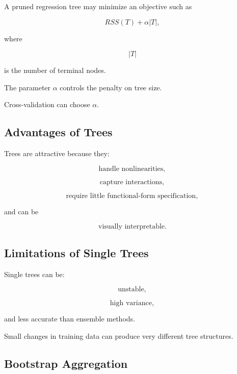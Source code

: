 A pruned regression tree may minimize an objective such as

\[
\boxed{
RSS(T)
+
\alpha
|T|,
}
\]

where

\[
|T|
\]

is the number of terminal nodes.

The parameter \(\alpha\) controls the penalty on tree size.

Cross-validation can choose \(\alpha\).

\subsection{Advantages of Trees}
\label{subsec:advantages-trees}

Trees are attractive because they:

\[
\boxed{
\text{handle nonlinearities},
}
\]

\[
\boxed{
\text{capture interactions},
}
\]

\[
\boxed{
\text{require little functional-form specification},
}
\]

and can be

\[
\boxed{
\text{visually interpretable}.
}
\]

\subsection{Limitations of Single Trees}
\label{subsec:limitations-single-trees}

Single trees can be:

\[
\boxed{
\text{unstable},
}
\]

\[
\boxed{
\text{high variance},
}
\]

and less accurate than ensemble methods.

Small changes in training data can produce very different tree
structures.

\subsection{Bootstrap Aggregation}
\label{subsec:bagging}

